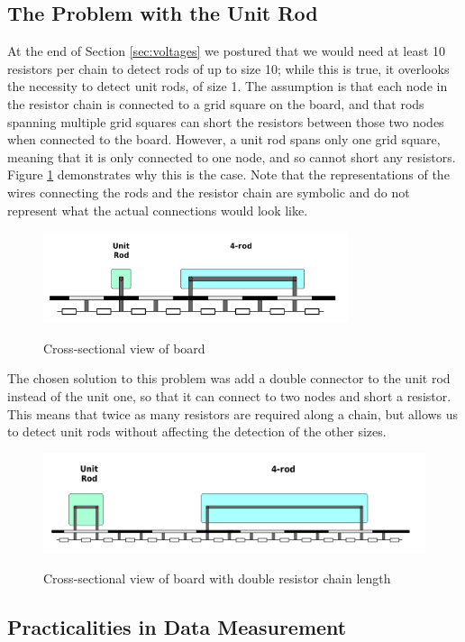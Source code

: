 \subsection{The Problem with the Unit Rod}

At the end of Section \ref{sec:voltages} we postured that we would need at least 10 resistors per chain to detect rods of up to size 10; while this is true, it overlooks the necessity to detect unit rods, of size 1. The assumption is that each node in the resistor chain is connected to a grid square on the board, and that rods spanning multiple grid squares can short the resistors between those two nodes when connected to the board. However, a unit rod spans only one grid square, meaning that it is only connected to one node, and so cannot short any resistors. Figure \ref{fig:unitrod} demonstrates why this is the case. Note that the representations of the wires connecting the rods and the resistor chain are symbolic and do not represent what the actual connections would look like.

\begin{figure}[H]
	\begin{center}
	\includegraphics[width=0.8\textwidth]{unitrod.png}\\ 
  	\caption{Cross-sectional view of board}
    \label{fig:unitrod}
    \end{center}
\end{figure}

The chosen solution to this problem was add a double connector to the unit rod instead of the unit one, so that it can connect to two nodes and short a resistor. This means that twice as many resistors are required along a chain, but allows us to detect unit rods without affecting the detection of the other sizes.

\begin{figure}[H]
	\begin{center}
	\includegraphics[width=\textwidth]{doubleunitrod.png}\\ 
  	\caption{Cross-sectional view of board with double resistor chain length}
    \label{fig:doibleunitrod}
    \end{center}
\end{figure}


\subsection{Practicalities in Data Measurement}


